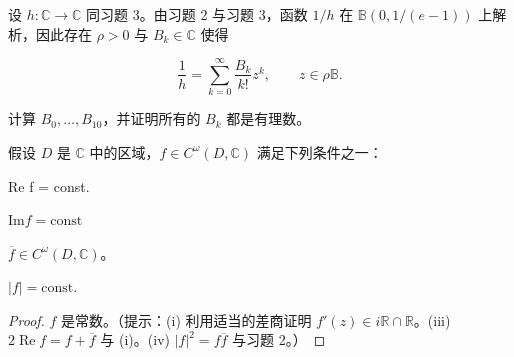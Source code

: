 \begin{exercises}
\item[4.]

设 $ h: \mathbb{C} \to \mathbb{C} $ 同习题 3。由习题 2 与习题 3，函数 $ 1/h $ 在 $ \mathbb{B}(0,1/(e-1)) $ 上解析，因此存在 $ \rho > 0 $ 与 $ B_k \in \mathbb{C} $ 使得

\[
\frac{1}{h}=\sum_{k=0}^{\infty}\frac{B_{k}}{k!}z^{k},\qquad z\in\rho\mathbb{B}.
\]

计算 $B_{0},\ldots,B_{10}$，并证明所有的 $B_{k}$ 都是有理数。

\item[5.]

假设 $D$ 是 $\mathbb{C}$ 中的区域，$f \in C^\omega(D,\mathbb{C})$ 满足下列条件之一：

\begin{subitems}
\item

Re f = const.

\item

$ \mathrm{Im} f = \mathrm{const} $

\item

$ \overline{f} \in C^\omega(D, \mathbb{C}) $。

\item

$ |f| = \mathrm{const}. $

\end{subitems}

\end{exercises}

\begin{proof}

$f$ 是常数。（提示：(i) 利用适当的差商证明 $f'(z) \in i\mathbb{R} \cap \mathbb{R}$。(iii) $2\operatorname{Re}f = f + \overline{f}$ 与 (i)。(iv) $|f|^2 = f\overline{f}$ 与习题 2。）

\end{proof}

